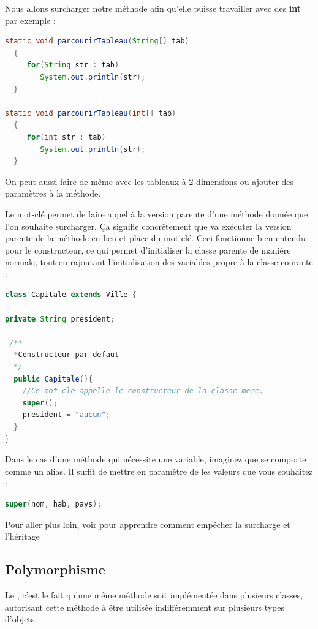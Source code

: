 \documentclass[a4paper,twoside]{article}
\begin{document}
Nous allons surcharger notre méthode afin qu'elle puisse travailler avec des \textbf{int} par exemple :
\begin{lstlisting}[language=java]
static void parcourirTableau(String[] tab)
  {
     for(String str : tab)
        System.out.println(str);
  }
        
static void parcourirTableau(int[] tab)
  {
     for(int str : tab)
        System.out.println(str);
  }
\end{lstlisting}

On peut aussi faire de même avec les tableaux à 2 dimensions ou ajouter des paramètres à la méthode.

\bigskip

Le mot-clé  permet de faire appel à la version parente d'une méthode donnée que l'on souhaite surcharger. Ça signifie concrêtement que  va exécuter la version parente de la méthode en lieu et place du mot-clé. Ceci fonctionne bien entendu pour le constructeur, ce qui permet d'initialiser la classe parente de manière normale, tout en rajoutant l'initialisation des variables propre à la classe courante : 
\begin{lstlisting}[language=java]
class Capitale extends Ville {
 
private String president;
 
 /**
  *Constructeur par defaut
  */
  public Capitale(){
    //Ce mot cle appelle le constructeur de la classe mere.  
    super();
    president = "aucun";
  }
}
\end{lstlisting}

\begin{remarque}
Dans le cas d'une méthode qui nécessite une variable, imaginez que  se comporte comme un alias. Il suffit de mettre en paramètre de  les valeurs que vous souhaitez : 
\begin{lstlisting}[language=java]
super(nom, hab, pays);
\end{lstlisting}
\end{remarque}

Pour aller plus loin, voir  pour apprendre comment empêcher la surcharge et l'héritage

\subsection{Polymorphisme}
Le , c'est le fait qu'une même méthode soit implémentée dans plusieurs classes, autorisant cette méthode à être utilisée indifféremment sur plusieurs types d'objets. 
\end{document}
